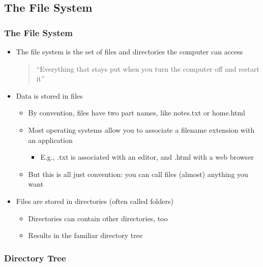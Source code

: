 \subsection{The File System}

\begin{frame}\frametitle{The File System}
\begin{itemize}
\item The file system is the set of files and directories the computer can access
\begin{quote}
     “Everything that stays put when you turn the computer off and restart it”
\end{quote}
\item Data is stored in files
\begin{itemize}
    \item By convention, files have two part names, like notes.txt or home.html
    \item Most operating systems allow you to associate a filename extension with an application
\begin{itemize}
          \item E.g., .txt is associated with an editor, and .html with a web browser
\end{itemize}
    \item But this is all just convention: you can call files (almost) anything you want
\end{itemize}
\item Files are stored in directories (often called folders)
\begin{itemize}
    \item Directories can contain other directories, too
    \item Results in the familiar directory tree
\end{itemize}
\end{itemize}
\end{frame}

\begin{frame}\frametitle{Directory Tree}

\end{frame}

